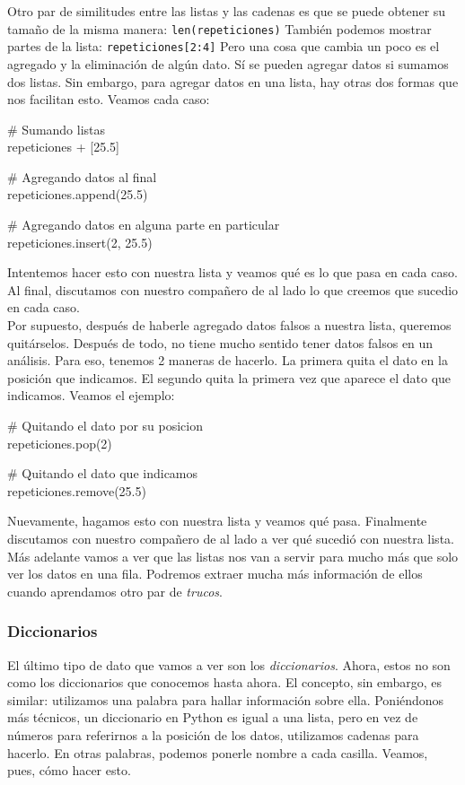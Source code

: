 \documentclass[10pt,letterpaper]{article}
\newcommand{\inlinecode}[1]{
\colorbox{light-gray}{\texttt{#1}}
}
\newenvironment{Code}
{
\begin{lrbox}{\selvestebox}%
\begin{minipage}{\dimexpr\columnwidth-2\fboxsep\relax}
\fontfamily{\ttdefault}\selectfont
}
{\end{minipage}\end{lrbox}%
\begin{center}
\colorbox{light-gray}{\usebox{\selvestebox}}
\end{center}
}
\begin{document}
Otro par de similitudes entre las listas y las cadenas es que se puede obtener su tama\~no de la misma manera: \inlinecode{len(repeticiones)} Tambi\'en podemos mostrar partes de la lista: \inlinecode{repeticiones[2:4]} Pero una cosa que cambia un poco es el agregado y la eliminaci\'on de alg\'un dato. S\'i se pueden agregar datos si sumamos dos listas. Sin embargo, para agregar datos en una lista, hay otras dos formas que nos facilitan esto. Veamos cada caso:

\begin{Code}
\# Sumando listas\\
repeticiones + [25.5]

\# Agregando datos al final\\
repeticiones.append(25.5)

\# Agregando datos en alguna parte en particular\\
repeticiones.insert(2, 25.5)
\end{Code}

Intentemos hacer esto con nuestra lista y veamos qu\'e es lo que pasa en cada caso. Al final, discutamos con nuestro compa\~nero de al lado lo que creemos que sucedio en cada caso.\\

Por supuesto, despu\'es de haberle agregado datos falsos a nuestra lista, queremos quit\'arselos. Despu\'es de todo, no tiene mucho sentido tener datos falsos en un an\'alisis. Para eso, tenemos 2 maneras de hacerlo. La primera quita el dato en la posici\'on que indicamos. El segundo quita la primera vez que aparece el dato que indicamos. Veamos el ejemplo:

\begin{Code}
\# Quitando el dato por su posicion\\
repeticiones.pop(2)

\# Quitando el dato que indicamos\\
repeticiones.remove(25.5)
\end{Code}

Nuevamente, hagamos esto con nuestra lista y veamos qu\'e pasa. Finalmente discutamos con nuestro compa\~nero de al lado a ver qu\'e sucedi\'o con nuestra lista.\\

M\'as adelante vamos a ver que las listas nos van a servir para mucho m\'as que solo ver los datos en una fila. Podremos extraer mucha m\'as informaci\'on de ellos cuando aprendamos otro par de \emph{trucos}.

\subsubsection{Diccionarios}
El \'ultimo tipo de dato que vamos a ver son los \emph{diccionarios}. Ahora, estos no son como los diccionarios que conocemos hasta ahora. El concepto, sin embargo, es similar: utilizamos una palabra para hallar informaci\'on sobre ella. Poni\'endonos m\'as t\'ecnicos, un diccionario en Python es igual a una lista, pero en vez de n\'umeros para referirnos a la posici\'on de los datos, utilizamos cadenas para hacerlo. En otras palabras, podemos ponerle nombre a cada casilla. Veamos, pues, c\'omo hacer esto.\\
\end{document}
